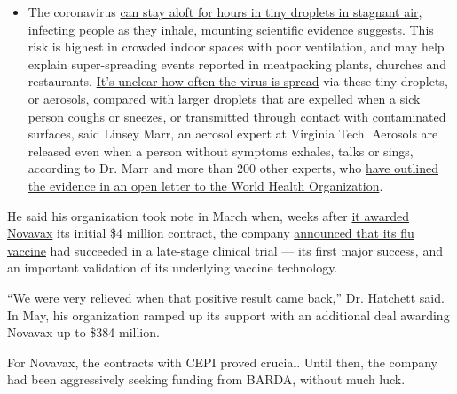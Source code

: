 \begin{itemize}
  \begin{itemize}
  \tightlist
  \item
    The coronavirus
    \href{https://www.nytimes3xbfgragh.onion/2020/07/04/health/239-experts-with-one-big-claim-the-coronavirus-is-airborne.html?action=click\&pgtype=Article\&state=default\&region=MAIN_CONTENT_3\&context=storylines_faq}{can
    stay aloft for hours in tiny droplets in stagnant air}, infecting
    people as they inhale, mounting scientific evidence suggests. This
    risk is highest in crowded indoor spaces with poor ventilation, and
    may help explain super-spreading events reported in meatpacking
    plants, churches and restaurants.
    \href{https://www.nytimes3xbfgragh.onion/2020/07/06/health/coronavirus-airborne-aerosols.html?action=click\&pgtype=Article\&state=default\&region=MAIN_CONTENT_3\&context=storylines_faq}{It's
    unclear how often the virus is spread} via these tiny droplets, or
    aerosols, compared with larger droplets that are expelled when a
    sick person coughs or sneezes, or transmitted through contact with
    contaminated surfaces, said Linsey Marr, an aerosol expert at
    Virginia Tech. Aerosols are released even when a person without
    symptoms exhales, talks or sings, according to Dr. Marr and more
    than 200 other experts, who
    \href{https://academic.oup.com/cid/article/doi/10.1093/cid/ciaa939/5867798}{have
    outlined the evidence in an open letter to the World Health
    Organization}.
  \end{itemize}
\end{itemize}

He said his organization took note in March when, weeks after
\href{https://ir.novavax.com/news-releases/news-release-details/novavax-awarded-funding-cepi-covid-19-vaccine-development}{it
awarded Novavax} its initial \$4 million contract, the company
\href{https://ir.novavax.com/news-releases/news-release-details/novavax-nanoflu-achieves-all-primary-endpoints-phase-3-clinical}{announced
that its flu vaccine} had succeeded in a late-stage clinical trial ---
its first major success, and an important validation of its underlying
vaccine technology.

``We were very relieved when that positive result came back,'' Dr.
Hatchett said. In May, his organization ramped up its support with an
additional deal awarding Novavax up to \$384 million.

For Novavax, the contracts with CEPI proved crucial. Until then, the
company had been aggressively seeking funding from BARDA, without much
luck.

